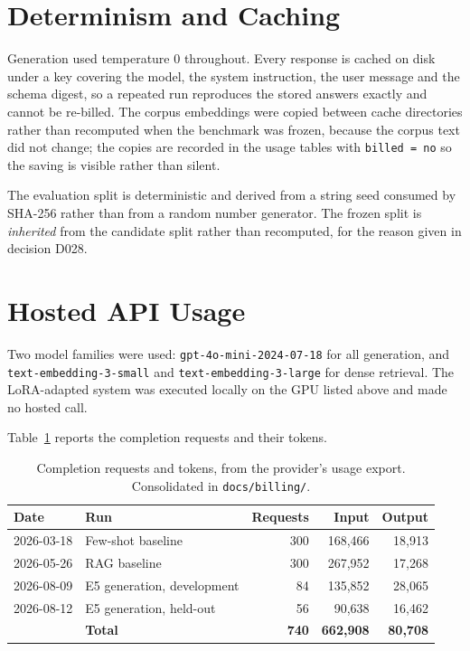 \section{Determinism and Caching}

Generation used temperature 0 throughout. Every response is cached on disk under
a key covering the model, the system instruction, the user message and the schema
digest, so a repeated run reproduces the stored answers exactly and cannot be
re-billed. The corpus embeddings were copied between cache directories rather
than recomputed when the benchmark was frozen, because the corpus text did not
change; the copies are recorded in the usage tables with
\texttt{billed = no} so the saving is visible rather than silent.

The evaluation split is deterministic and derived from a string seed consumed by
SHA-256 rather than from a random number generator. The frozen split is
\emph{inherited} from the candidate split rather than recomputed, for the reason
given in decision D028.

\section{Hosted API Usage}

Two model families were used: \texttt{gpt-4o-mini-2024-07-18} for all generation,
and \texttt{text-embedding-3-small} and \texttt{text-embedding-3-large} for dense
retrieval. The LoRA-adapted system was executed locally on the GPU listed above
and made no hosted call.

Table~\ref{tab:usage-completions} reports the completion requests and their tokens.

\begin{table}[htbp]
  \centering
  \caption{Completion requests and tokens, from the provider's usage export. Consolidated in \texttt{docs/billing/}.}
  \label{tab:usage-completions}
  \small
  \begin{tabular}{llrrr}
    \toprule
    \textbf{Date} & \textbf{Run} & \textbf{Requests} & \textbf{Input} & \textbf{Output} \\
    \midrule
    2026-03-18 & Few-shot baseline & 300 & 168{,}466 & 18{,}913 \\
    2026-05-26 & RAG baseline & 300 & 267{,}952 & 17{,}268 \\
    2026-08-09 & E5 generation, development & 84 & 135{,}852 & 28{,}065 \\
    2026-08-12 & E5 generation, held-out & 56 & 90{,}638 & 16{,}462 \\
    \midrule
    & \textbf{Total} & \textbf{740} & \textbf{662{,}908} & \textbf{80{,}708} \\
    \bottomrule
  \end{tabular}
\end{table}

